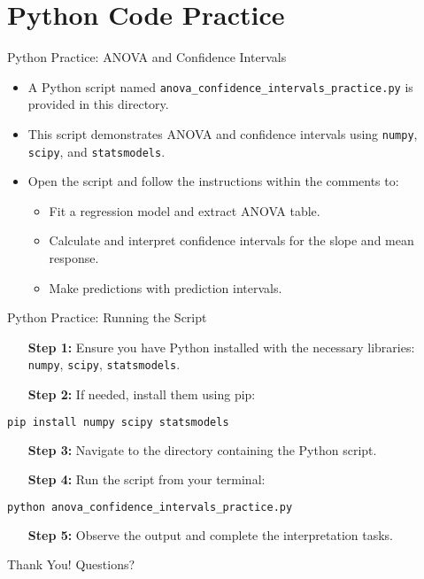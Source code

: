 \documentclass[aspectratio=169]{beamer}
\begin{document}
\section{Python Code Practice}
\begin{frame}{Python Practice: ANOVA and Confidence Intervals}
  \begin{itemize}
    \item A Python script named \texttt{anova\_confidence\_intervals\_practice.py} is provided in this directory.
    \item This script demonstrates ANOVA and confidence intervals using \texttt{numpy}, \texttt{scipy}, and \texttt{statsmodels}.
    \item Open the script and follow the instructions within the comments to:
    \begin{itemize}
      \item Fit a regression model and extract ANOVA table.
      \item Calculate and interpret confidence intervals for the slope and mean response.
      \item Make predictions with prediction intervals.
    \end{itemize}
  \end{itemize}
\end{frame}

\begin{frame}[fragile]{Python Practice: Running the Script}
  \vspace{-0.2cm}
  \begin{itemize}
    \item[\textbf{Step 1:}] Ensure you have Python installed with the necessary libraries: \texttt{numpy}, \texttt{scipy}, \texttt{statsmodels}.
    \item[\textbf{Step 2:}] If needed, install them using pip:
  \end{itemize}
  
  \begin{lstlisting}[language=bash]
pip install numpy scipy statsmodels
  \end{lstlisting}
  
  \begin{itemize}
    \item[\textbf{Step 3:}] Navigate to the directory containing the Python script.
    \item[\textbf{Step 4:}] Run the script from your terminal:
  \end{itemize}
  
  \begin{lstlisting}[language=bash]
python anova_confidence_intervals_practice.py
  \end{lstlisting}
  
  \begin{itemize}
    \item[\textbf{Step 5:}] Observe the output and complete the interpretation tasks.
  \end{itemize}
\end{frame}

\begin{frame}
  \centering
  \Huge Thank You!
  \vspace{1cm}
  \normalsize Questions?
\end{frame}
\end{document}
